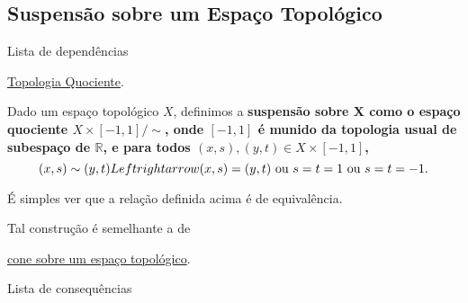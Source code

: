 \subsection{Suspensão sobre um Espaço Topológico}
\label{suspensao-def}
\begin{titlemize}{Lista de dependências}
	\item \hyperref[topologia-quociente-def]{Topologia Quociente}.
\end{titlemize}
\begin{def}[Suspensão]
	Dado um espaço topológico $X$, definimos a \bf{suspensão sobre X} como o espaço quociente $X\times [-1,1]/\sim$, onde $[-1,1]$ é munido da topologia usual de subespaço de $\mathbb{R}$, e para todos $(x,s),(y,t) \in X\times [-1,1]$,\[
    (x,s)\sim(y,t) \\Leftrightarrow (x,s)=(y,t)\text{ ou }s=t=1\text{ ou }s=t=-1.
    \]
\end{def}

É simples ver que a relação definida acima é de equivalência.

Tal construção é semelhante a de \item \hyperref[cone-def]{cone sobre um espaço topológico}.

\begin{titlemize}{Lista de consequências}
\end{titlemize}